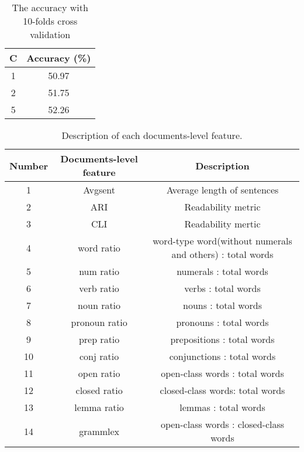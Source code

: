 \documentclass[twocolumn]{article}
\begin{document}
\begin{table}
    \begin{center}     
        \begin{tabular}{c | c}
            C & Accuracy (\%) \\
            \hline
            1 & 50.97 \\
            2 & 51.75 \\
            5 & 52.26 \\
        \end{tabular}
        \caption{The accuracy with 10-folds cross validation}
        \label{fig:accuracy_cv}
    \end{center}
\end{table}

\begin{table*}
    \begin{center}     
        \begin{tabular}{c | c | c }
            Number & Documents-level feature & Description \\
            \hline
            1 & Avgsent & Average length of sentences \\
            2 & ARI & Readability metric \\
            3 & CLI & Readability mertic \\
            4 & word ratio & word-type word(without numerals and others) : total words \\
            5 & num ratio & numerals : total words \\
            6 & verb ratio & verbs : total words \\
            7 & noun ratio & nouns : total words \\
            8 & pronoun ratio & pronouns : total words \\
            9 & prep ratio & prepositions : total words \\
            10 & conj ratio & conjunctions : total words \\
            11 & open ratio & open-class words : total words \\
            12 & closed ratio & closed-class words: total words \\
            13 & lemma ratio & lemmas : total words \\
            14 & grammlex & open-class words : closed-class words \\
        \end{tabular}
        \caption{Description of each documents-level feature.}
        \label{fig:docs-level_features}
    \end{center}
\end{table*}
\end{document}

